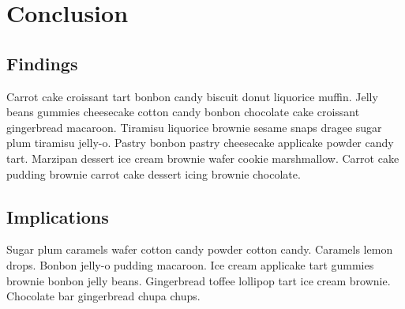 
\graphicspath{{9/figures/}}
\chapter{Conclusion}
\label{chp:conclusion}

\section{Findings}
Carrot cake croissant tart bonbon candy biscuit donut liquorice muffin. 
Jelly beans gummies cheesecake cotton candy bonbon chocolate cake croissant gingerbread macaroon. 
Tiramisu liquorice brownie sesame snaps dragee sugar plum tiramisu jelly-o. 
Pastry bonbon pastry cheesecake applicake powder candy tart. 
Marzipan dessert ice cream brownie wafer cookie marshmallow. 
Carrot cake pudding brownie carrot cake dessert icing brownie chocolate.


\section{Implications}

Sugar plum caramels wafer cotton candy powder cotton candy. 
Caramels lemon drops. 
Bonbon jelly-o pudding macaroon. 
Ice cream applicake tart gummies brownie bonbon jelly beans. 
Gingerbread toffee lollipop tart ice cream brownie.
Chocolate bar gingerbread chupa chups. 

